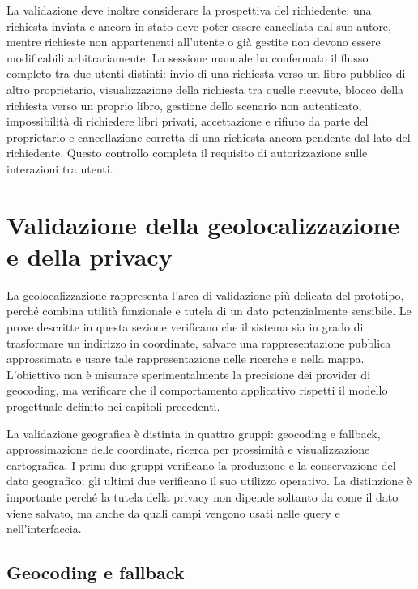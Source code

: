 La validazione deve inoltre considerare la prospettiva del richiedente: una richiesta inviata e ancora in stato  deve poter essere cancellata dal suo autore, mentre richieste non appartenenti all'utente o già gestite non devono essere modificabili arbitrariamente. La sessione manuale ha confermato il flusso completo tra due utenti distinti: invio di una richiesta verso un libro pubblico di altro proprietario, visualizzazione della richiesta tra quelle ricevute, blocco della richiesta verso un proprio libro, gestione dello scenario non autenticato, impossibilità di richiedere libri privati, accettazione e rifiuto da parte del proprietario e cancellazione corretta di una richiesta ancora pendente dal lato del richiedente. Questo controllo completa il requisito di autorizzazione sulle interazioni tra utenti.



\section{Validazione della geolocalizzazione e della privacy}
\label{sec:validazione-geolocalizzazione}

La geolocalizzazione rappresenta l'area di validazione più delicata del prototipo, perché combina utilità funzionale e tutela di un dato potenzialmente sensibile. Le prove descritte in questa sezione verificano che il sistema sia in grado di trasformare un indirizzo in coordinate, salvare una rappresentazione pubblica approssimata e usare tale rappresentazione nelle ricerche e nella mappa. L'obiettivo non è misurare sperimentalmente la precisione dei provider di geocoding, ma verificare che il comportamento applicativo rispetti il modello progettuale definito nei capitoli precedenti.

La validazione geografica è distinta in quattro gruppi: geocoding e fallback, approssimazione delle coordinate, ricerca per prossimità e visualizzazione cartografica. I primi due gruppi verificano la produzione e la conservazione del dato geografico; gli ultimi due verificano il suo utilizzo operativo. La distinzione è importante perché la tutela della privacy non dipende soltanto da come il dato viene salvato, ma anche da quali campi vengono usati nelle query e nell'interfaccia.

\subsection{Geocoding e fallback}
\label{subsec:test-geocoding}

